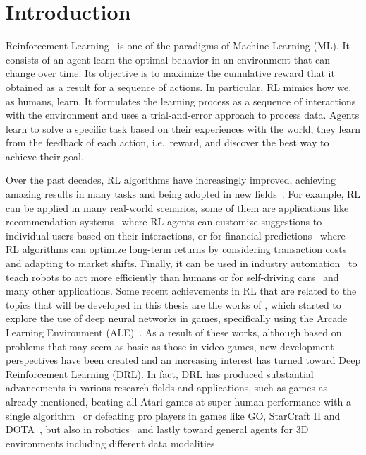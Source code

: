 
\chapter{Introduction}
\label{ch:introduction}
Reinforcement Learning~\citep{sutton1998introduction} is one of the paradigms of Machine Learning (ML).
It consists of an agent learn the optimal behavior in an environment that can change over time.
Its objective is to maximize the cumulative reward that it obtained as a result for a sequence of actions.
In particular, RL mimics how we, as humans, learn.
It formulates the learning process as a sequence of interactions with the environment and uses a trial-and-error approach to process data.
Agents learn to solve a specific task based on their experiences with the world, they learn from the feedback of each action, i.e.\ reward,  and discover the best way to achieve their goal.

Over the past decades, RL algorithms have increasingly improved, achieving amazing results in many tasks and being adopted in new fields~\citep{li2017deep, zhang2020deep}.
For example, RL can be applied in many real-world scenarios, some of them are applications like recommendation systems~\citep{zhao2019deep} where RL agents can customize suggestions to individual users based on their interactions, or for financial predictions~\citep{zhang2019deep} where RL algorithms can optimize long-term returns by considering transaction costs and adapting to market shifts.
Finally, it can be used in industry automation~\citep{levine2018learning} to teach robots to act more efficiently than humans or for self-driving cars~\citep{kiran2021deep} and many other applications.
Some recent achievements in RL that are related to the topics that will be developed in this thesis are
the works of \citet{mnih2013playing, mnih2015human}, which started to explore the use of deep neural networks in games, specifically using the Arcade Learning Environment (ALE)~\citep{bellemare2013atari}.
As a result of these works, although based on problems that may seem as basic as those in video games, new development perspectives have been created and an increasing interest has turned toward Deep Reinforcement Learning (DRL).
In fact, DRL has produced substantial advancements in various research fields and applications, such as games as already mentioned, beating all Atari games at super-human performance with a single algorithm~\citep{agent57} or defeating pro players in games like GO, StarCraft II and DOTA~\citep{alphago, starcraft, dota}, but also in robotics~\citep{rlrob, bousmalis2023robocat} and lastly toward general agents for 3D environments including different data modalities~\citep{sima2024}.

